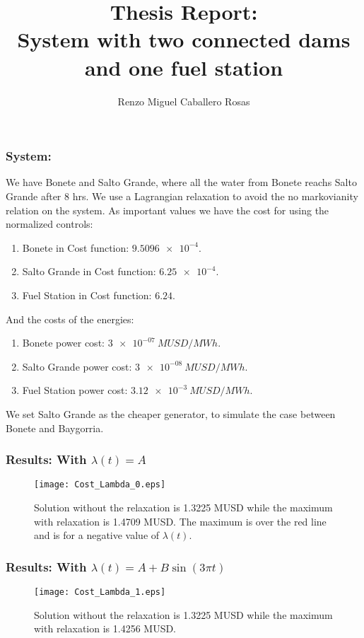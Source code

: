 \documentclass[aspectratio=169]{beamer}\usepackage[utf8]{inputenc}
\title{Thesis Report:\\
System with two connected dams and one fuel station}
\subtitle{Renzo Miguel Caballero Rosas}
\begin{document}
\begin{frame}
\titlepage
\end{frame}

\begin{frame}\frametitle{System:}
We have Bonete and Salto Grande, where all the water from Bonete reachs Salto Grande after 8 hrs. We use a Lagrangian relaxation to avoid the no markovianity relation on the system. As important values we have the cost for using the normalized controls:
\begin{enumerate}
\item Bonete in Cost function: $\num{9.5096e-4}$.
\item Salto Grande in Cost function: $\num{6.25e-4}$.
\item Fuel Station in Cost function: $6.24$.
\end{enumerate}
And the costs of the energies:
\begin{enumerate}
\item Bonete power cost: $\SI{3e-07}{MUSD/MWh}$.
\item Salto Grande power cost: $\SI{3e-08}{MUSD/MWh}$.
\item Fuel Station power cost: $\SI{3.12e-3}{MUSD/MWh}$.
\end{enumerate}
We set Salto Grande as the cheaper generator, to simulate the case between Bonete and Baygorria.
\end{frame}

\begin{frame}\frametitle{Results: With $\lambda(t)=A$}
\begin{figure}[h!]
\centering
\texttt{[image: Cost\_Lambda\_0.eps]}
\caption{Solution without the relaxation is 1.3225 MUSD while the maximum with relaxation is 1.4709 MUSD. The maximum is over the red line and is for a negative value of $\lambda(t)$.}
\end{figure}
\end{frame}

\begin{frame}\frametitle{Results: With $\lambda(t)=A+B\sin(3\pi t)$}
\begin{figure}[h!]
\centering
\texttt{[image: Cost\_Lambda\_1.eps]}
\caption{Solution without the relaxation is 1.3225 MUSD while the maximum with relaxation is 1.4256 MUSD.}
\end{figure}
\end{frame}
\end{document}
